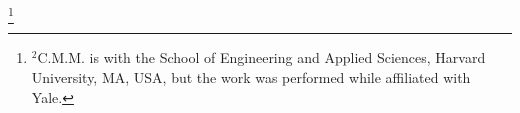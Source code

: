 \documentclass[letterpaper,10pt,conference,twoside]{IEEEtran}
\theoremstyle{definition}
\begin{document}
{  \thanks{${}^\text{2}$C.\hspace*{.4ex}M.\hspace*{.4ex}M. is with the School of Engineering and Applied Sciences, Harvard University, MA, USA, but the work was performed while affiliated with Yale.}
}

\maketitle
\end{document}
